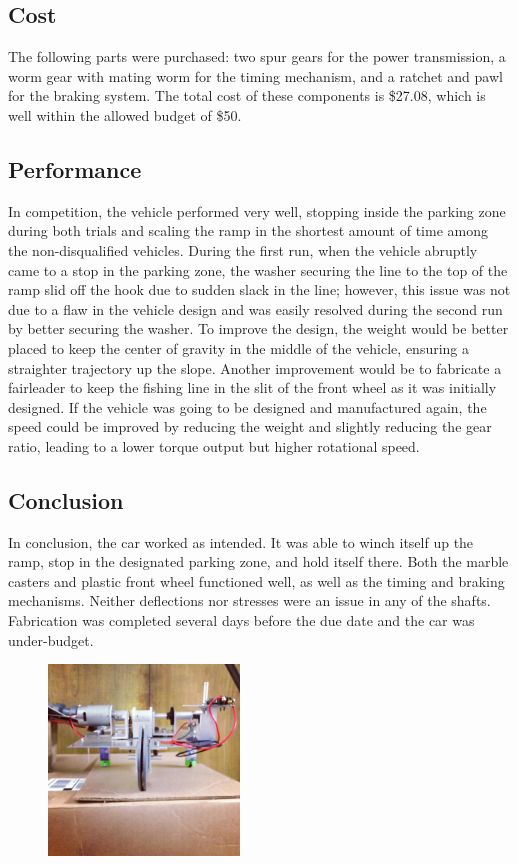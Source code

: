 \documentclass[10pt,letterpaper,oneside]{article}
\begin{document}
\centering
\subsection*{Cost}

\raggedright
The following parts were purchased: two spur gears for the power transmission, a worm gear with mating worm for the timing mechanism, and a ratchet and pawl for the braking system. The total cost of these components is \$27.08, which is well within the allowed budget of \$50.

\centering
\subsection*{Performance}

\raggedright
In competition, the vehicle performed very well, stopping inside the parking zone during both trials and scaling the ramp in the shortest amount of time among the non-disqualified vehicles. During the first run, when the vehicle abruptly came to a stop in the parking zone, the washer securing the line to the top of the ramp slid off the hook due to sudden slack in the line; however, this issue was not due to a flaw in the vehicle design and was easily resolved during the second run by better securing the washer. To improve the design, the weight would be better placed to keep the center of gravity in the middle of the vehicle, ensuring a straighter trajectory up the slope. Another improvement would be to fabricate a fairleader to keep the fishing line in the slit of the front wheel as it was initially designed. If the vehicle was going to be designed and manufactured again, the speed could be improved by reducing the weight and slightly reducing the gear ratio, leading to a lower torque output but higher rotational speed.

\centering
\subsection*{Conclusion}

\raggedright
In conclusion, the car worked as intended. It was able to winch itself up the ramp, stop in the designated parking zone, and hold itself there. Both the marble casters and plastic front wheel functioned well, as well as the timing and braking mechanisms. Neither deflections nor stresses were an issue in any of the shafts. Fabrication was completed several days before the due date and the car was under-budget.

\begin{figure}[b]
\centering
\includegraphics[height=2in, keepaspectratio]{frontview}
\end{figure}
\end{document}
